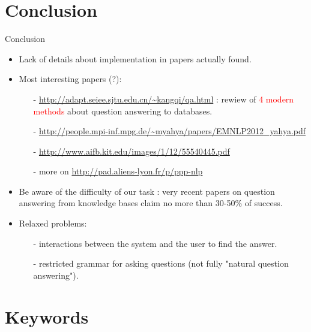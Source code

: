 \documentclass[10pt]{beamer}
\begin{document}

\section{Conclusion}

\begin{frame}{Conclusion}

\begin{itemize}
	\item Lack of details about implementation in papers actually found.
	\item Most interesting papers (?):
		\begin{itemize}
			\item[-] \url{http://adapt.seiee.sjtu.edu.cn/~kangqi/qa.html} : rewiew of \textcolor{red}{4 modern methods} about question answering to databases. 
			\item[-] \url{http://people.mpi-inf.mpg.de/~myahya/papers/EMNLP2012_yahya.pdf}
			\item[-] \url{http://www.aifb.kit.edu/images/1/12/55540445.pdf}
			\item[-] more on \url{http://pad.aliens-lyon.fr/p/ppp-nlp}
		\end{itemize}
	\item	Be aware of the difficulty of our task : very recent papers on question answering from knowledge bases claim no more than 30-50\% of success.
	\item Relaxed problems:
		\begin{itemize}
			\item[-] interactions between the system and the user to find the answer.
			\item[-] restricted grammar for asking questions (not fully "natural question answering").
		\end{itemize}
\end{itemize}


\end{frame}


\section{Keywords}
\end{document}
